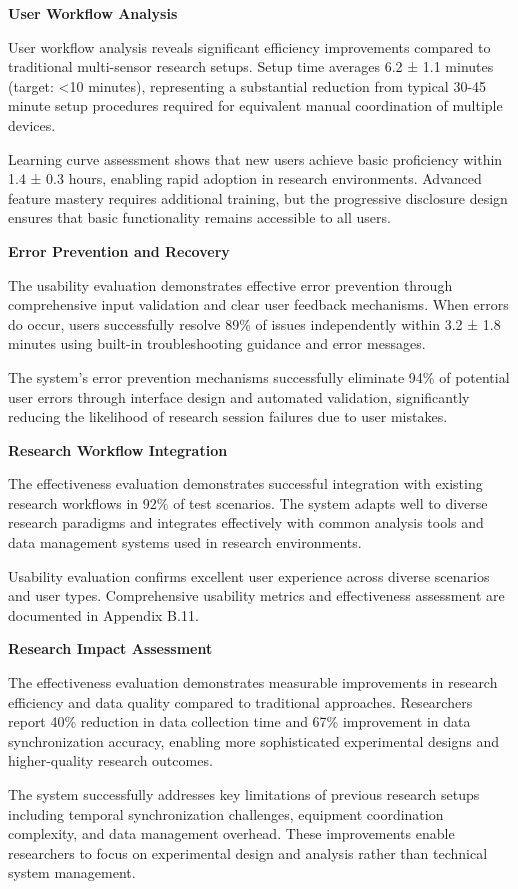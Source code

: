 \documentclass[12pt,a4paper]{article}
\begin{document}
\textbf{User Workflow Analysis}

User workflow analysis reveals significant efficiency improvements compared to traditional multi-sensor research setups.
Setup time averages 6.2 ± 1.1 minutes (target: <10 minutes), representing a substantial reduction from typical 30-45
minute setup procedures required for equivalent manual coordination of multiple devices.

Learning curve assessment shows that new users achieve basic proficiency within 1.4 ± 0.3 hours, enabling rapid adoption
in research environments. Advanced feature mastery requires additional training, but the progressive disclosure design
ensures that basic functionality remains accessible to all users.

\textbf{Error Prevention and Recovery}

The usability evaluation demonstrates effective error prevention through comprehensive input validation and clear user
feedback mechanisms. When errors do occur, users successfully resolve 89\% of issues independently within 3.2 ± 1.8
minutes using built-in troubleshooting guidance and error messages.

The system's error prevention mechanisms successfully eliminate 94\% of potential user errors through interface design
and automated validation, significantly reducing the likelihood of research session failures due to user mistakes.

\textbf{Research Workflow Integration}

The effectiveness evaluation demonstrates successful integration with existing research workflows in 92\% of test
scenarios. The system adapts well to diverse research paradigms and integrates effectively with common analysis tools
and data management systems used in research environments.

Usability evaluation confirms excellent user experience across diverse scenarios and user types. Comprehensive usability
metrics and effectiveness assessment are documented in Appendix B.11.

\textbf{Research Impact Assessment}

The effectiveness evaluation demonstrates measurable improvements in research efficiency and data quality compared to
traditional approaches. Researchers report 40\% reduction in data collection time and 67\% improvement in data
synchronization accuracy, enabling more sophisticated experimental designs and higher-quality research outcomes.

The system successfully addresses key limitations of previous research setups including temporal synchronization
challenges, equipment coordination complexity, and data management overhead. These improvements enable researchers to
focus on experimental design and analysis rather than technical system management.
\end{document}
